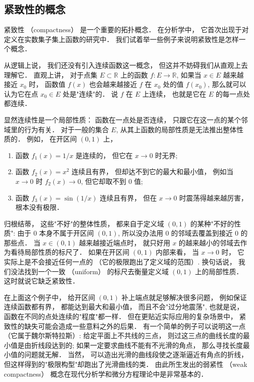 

\subsection{紧致性的概念}
紧致性 （compactness） 是一个重要的拓扑概念． 在分析学中， 它首次出现于对定义在实数集子集上函数的研究中． 我们试着举一些例子来说明紧致性是怎样一个概念．

从逻辑上说， 我们还没有引入连续函数这一概念， 但这并不妨碍我们从直观上去理解它． 直观上讲， 对于点集 $E\subset\mathbb{R}$ 上的函数 $f:E\to\mathbb{R}$, 如果当 $x\in E$ 越来越接近 $x_0$ 时， 函数值 $f(x)$ 也会越来越接近 $f$ 在 $x_0$ 处的值 $f(x_0)$, 那么就可以认为它在点 $x_0\in E$ 处是"连续"的． 说 $f$ 在 $E$ 上连续， 也就是它在 $E$ 的每一点处都连续． 

显然连续性是一个局部性质： 函数在一点处是否连续， 只跟它在这一点的某个邻域里的行为有关． 对于一般的集合 $E$, 从其上函数的局部性质是无法推出整体性质的． 例如， 在开区间 $(0,1)$ 上，

\begin{enumerate}
\item 函数 $f_1(x)=1/x$ 是连续的， 但它在 $x\to0$ 时无界; 
\item 函数 $f_2(x)=x^2$ 连续且有界， 但却达不到它的最大和最小值， 例如当 $x\to0$ 时 $f_2(x)\to0$, 但它却取不到 $0$ 值; 
\item 函数 $f_3(x)=\sin(1/x)$ 连续且有界， 但在 $x\to0$ 时震荡得越来越厉害， 根本没有极限． 
\end{enumerate}

归根结蒂， 这些"不好"的整体性质， 都来自于定义域 $(0,1)$ 的某种"不好的性质": 由于 $0$ 本身不属于开区间 $(0,1)$, 所以没办法用 $0$ 的邻域去覆盖到接近 $0$ 的那些点． 当 $x\in(0,1)$ 越来越接近端点时， 就只好用 $x$ 的越来越小的邻域去作为看待局部性质的标尺了． 如果在开区间 $(0,1)$ 内部来看， 当 $x\to0$ 时， 它实际上是不会接近任何一点的 （它的极限跑出了定义域的范围）. 换句话说， 我们没法找到一个一致 （uniform） 的标尺去衡量定义域 $(0,1)$ 上的局部性质． 这时就说它缺乏紧致性． 

在上面这个例子中， 给开区间 $(0,1)$ 补上端点就足够解决很多问题， 例如保证连续函数都有界， 都能达到最大和最小值， 而且不会"过分地震荡", 也就是说， 函数在不同的点处连续的"程度"都一样． 但在更贴近实际应用的复杂场景中， 紧致性的缺失可能会造成一些意料之外的后果． 有一个简单的例子可以说明这一点 （它属于魏尔斯特拉斯）: 给定平面上不共线的三点， 则过这三点的曲线长度的最小值是由折线段达到的; 如果一定要求曲线不能有不光滑的角点， 那么寻找长度最小值的问题就无解． 当然， 可以造出光滑的曲线段使之逐渐逼近有角点的折线， 但这样得到的"极限构型"却跑出了光滑曲线的类． 由此所生发出的弱紧性 （weak compactness） 概念在现代分析学和微分方程理论中是非常基本的．

